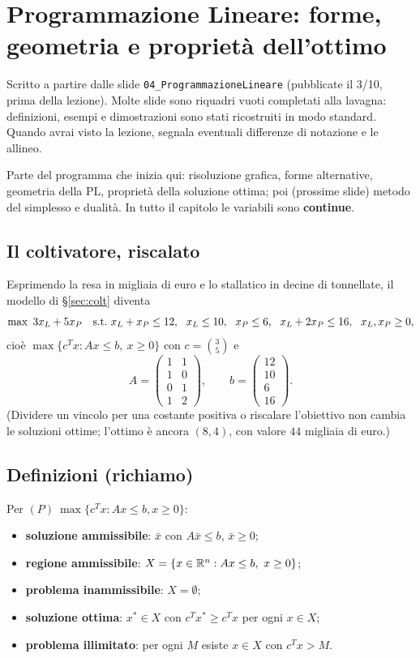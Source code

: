 \chapter[Programmazione Lineare: geometria e ottimo]{Programmazione Lineare: forme, geometria e proprietà dell'ottimo}\label{cap:pl}

\begin{oss}
Scritto a partire dalle slide \texttt{04\_ProgrammazioneLineare} (pubblicate il 3/10, prima della lezione). Molte slide sono riquadri vuoti completati alla lavagna: definizioni, esempi e dimostrazioni sono stati ricostruiti in modo standard. Quando avrai visto la lezione, segnala eventuali differenze di notazione e le allineo.
\end{oss}

Parte del programma che inizia qui: risoluzione grafica, forme alternative, geometria della PL, proprietà della soluzione ottima; poi (prossime slide) metodo del simplesso e dualità. In tutto il capitolo le variabili sono \textbf{continue}.

\section{Il coltivatore, riscalato}

Esprimendo la resa in migliaia di euro e lo stallatico in decine di tonnellate, il modello di \S\ref{sec:colt} diventa
\[
\max\ 3x_L+5x_P\quad \st\ x_L+x_P\le12,\ \ x_L\le10,\ \ x_P\le6,\ \ x_L+2x_P\le16,\ \ x_L,x_P\ge0,
\]
cioè $\max\{c^Tx: Ax\le b,\ x\ge0\}$ con
$c=\binom{3}{5}$ e
\[
A=\begin{pmatrix}1&1\\1&0\\0&1\\1&2\end{pmatrix},\qquad b=\begin{pmatrix}12\\10\\6\\16\end{pmatrix}.
\]
(Dividere un vincolo per una costante positiva o riscalare l'obiettivo non cambia le soluzioni ottime; l'ottimo è ancora $(8,4)$, con valore $44$ migliaia di euro.)

\section{Definizioni (richiamo)}
Per $(P)\ \max\{c^Tx: Ax\le b, x\ge0\}$:
\begin{itemize}[nosep]
\item \textbf{soluzione ammissibile}: $\bar x$ con $A\bar x\le b$, $\bar x\ge0$;
\item \textbf{regione ammissibile}: $X=\{x\in\mathbb{R}^n: Ax\le b,\ x\ge0\}$;
\item \textbf{problema inammissibile}: $X=\emptyset$;
\item \textbf{soluzione ottima}: $x^*\in X$ con $c^Tx^*\ge c^Tx$ per ogni $x\in X$;
\item \textbf{problema illimitato}: per ogni $M$ esiste $x\in X$ con $c^Tx>M$.
\end{itemize}

